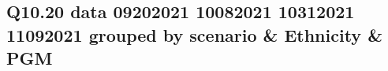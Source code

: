 \subsection{Q10.20 data 09202021 10082021 10312021 11092021 grouped by scenario \& Ethnicity \& PGM}

\begin{comment}
                                  EFPR        EO      EFNR     n    pvalue
(frauth, Maj, Advantaged)     0.530303  0.469697  0.515152  33.0  0.620400
(frauth, Min, Advantaged)     0.522727  0.477273  0.363636  22.0  0.737562
(frauth, Min, Disadvantaged)  0.404762  0.595238  0.523810  21.0  0.287938
(icu, Maj, Advantaged)        0.685185  0.314815  0.666667  27.0  0.030762
(icu, Maj, Disadvantaged)     0.571429  0.428571  0.571429   7.0  0.444564
(icu, Min, Advantaged)        0.450000  0.550000  0.300000  10.0  0.873227
(icu, Min, Disadvantaged)     0.450000  0.550000  0.725000  20.0  0.716623
(rent, Maj, Advantaged)       0.423077  0.576923  0.461538  26.0  0.704787
(rent, Maj, Disadvantaged)    0.333333  0.666667  0.541667  12.0  0.125971
(rent, Min, Advantaged)       0.312500  0.687500  0.312500   8.0  0.133614
(rent, Min, Disadvantaged)    0.557692  0.442308  0.403846  26.0  0.345427
\end{comment}

